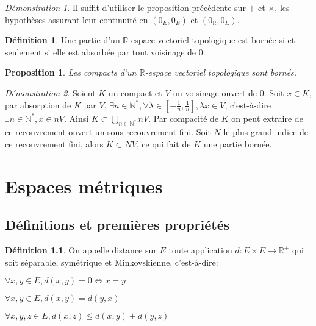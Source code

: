 \documentclass[a4paper, 11pt, french]{book}
\newenvironment{itemise}{\itemize}{\enditemize}
\theoremstyle{plain} %
\newtheorem{proposition}{Proposition}
\theoremstyle{definition} %
\newtheorem{definition}{Définition}
\theoremstyle{remark} %
\newtheorem*{demonstration}{Démonstration}
\newcommand{\1}{\mathds{1}}
\newcommand{\N}{\mathbb{N}}
\newcommand{\R}{\mathbb{R}}
\begin{document}
\begin{demonstration}
	Il suffit d'utiliser le proposition précédente sur $+$ et $\times$, les hypothèses assurant leur continuité en $(0_E, 0_E)$ et $(0_\R, 0_E)$.
\end{demonstration}

\begin{definition}
	Une partie d'un $\R$-espace vectoriel topologique est bornée si et seulement si elle est absorbée par tout voisinage de 0.
\end{definition}

\begin{proposition}
	Les compacts d'un $\R$-espace vectoriel topologique sont bornés.
\end{proposition}

\begin{demonstration}
	Soient $K$ un compact et $V$ un voisinage ouvert de 0.
	Soit $x\in K$, par absorption de $K$ par $V$, $\exists n\in\N^*, \forall\lambda\in[-\frac{1}{n}, \frac{1}{n}], \lambda x\in V$, c'est-à-dire $\exists n\in\N^*, x\in nV$.
	Ainsi $K\subset\bigcup_{n\in\N^*}nV$.
	Par compacité de $K$ on peut extraire de ce recouvrement ouvert un sous recouvrement fini.
	Soit $N$ le plus grand indice de ce recouvrement fini, alors $K\subset NV$, ce qui fait de $K$ une partie bornée.
\end{demonstration}

\chapter{Espaces métriques}

\section{Définitions et premières propriétés}

\begin{definition}
	On appelle distance sur $E$ toute application $d:E\times E\rightarrow\R^+$ qui soit séparable, symétrique et Minkovskienne, c'est-à-dire:
	\begin{itemise}
		\item $\forall x, y\in E, d(x, y)=0\iff x=y$
		\item $\forall x, y\in E, d(x, y)=d(y, x)$
		\item $\forall x, y, z\in E, d(x, z)\leqslant d(x, y)+d(y, z)$
	\end{itemise}
\end{definition}
\end{document}
